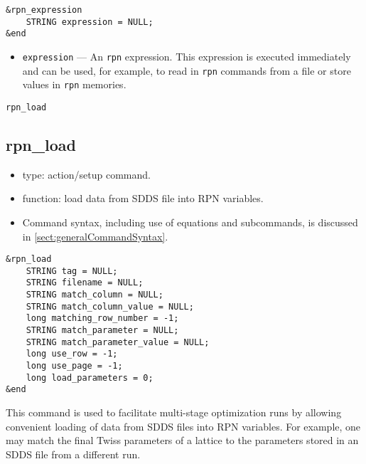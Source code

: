 \documentclass[11pt]{article}
\begin{document}
\begin{verbatim}
&rpn_expression
    STRING expression = NULL;
&end
\end{verbatim}

\begin{itemize}
\item \verb|expression| --- An {\tt rpn} expression.  This expression is executed immediately and can be
used, for example, to read in {\tt rpn} commands from a file or store values in {\tt rpn} memories.
\end{itemize}

\newpage
\begin{center}{\Large\verb|rpn_load|}\end{center}
\subsection{rpn\_load \label{subsec:rpnload}}

\begin{itemize}
\item type: action/setup command.
\item function: load data from SDDS file into RPN variables.
\item Command syntax, including use of equations and subcommands, is discussed in \ref{sect:generalCommandSyntax}.
\end{itemize}

\begin{verbatim}
&rpn_load
    STRING tag = NULL;
    STRING filename = NULL;
    STRING match_column = NULL;
    STRING match_column_value = NULL;
    long matching_row_number = -1;
    STRING match_parameter = NULL;
    STRING match_parameter_value = NULL;
    long use_row = -1;
    long use_page = -1;
    long load_parameters = 0;
&end
\end{verbatim}

This command is used to facilitate multi-stage optimization runs by allowing convenient
loading of data from SDDS files into RPN variables.  For example, one may match the
final Twiss parameters of a lattice to the parameters stored in an SDDS file from
a different run.
\end{document}
